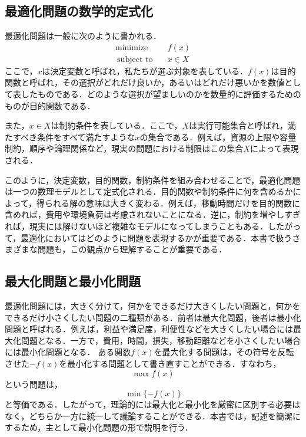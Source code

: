 \subsection{最適化問題の数学的定式化}
最適化問題は一般に次のように書かれる．
\begin{align}
\text{minimize}\quad&f(x)\\\
\text{subject to}\quad&x\in X
\end{align}
ここで，$x$は決定変数と呼ばれ，私たちが選ぶ対象を表している．$f(x)$は目的関数と呼ばれ，その選択がどれだけ良いか，あるいはどれだけ悪いかを数値として表したものである．どのような選択が望ましいのかを数量的に評価するためのものが目的関数である．

また，$x\in X$は制約条件を表している．ここで，$X$は実行可能集合と呼ばれ，満たすべき条件をすべて満たすような$x$の集合である．例えば，資源の上限や容量制約，順序や論理関係など，現実の問題における制限はこの集合$X$によって表現される．

このように，決定変数，目的関数，制約条件を組み合わせることで，最適化問題は一つの数理モデルとして定式化される．目的関数や制約条件に何を含めるかによって，得られる解の意味は大きく変わる．例えば，移動時間だけを目的関数に含めれば，費用や環境負荷は考慮されないことになる．逆に，制約を増やしすぎれば，現実には解けないほど複雑なモデルになってしまうこともある．したがって，最適化においてはどのように問題を表現するかが重要である．本書で扱うさまざまな問題も，この観点から理解することが重要である．

\subsection{最大化問題と最小化問題}

最適化問題には，大きく分けて，何かをできるだけ大きくしたい問題と，何かをできるだけ小さくしたい問題の二種類がある．前者は最大化問題，後者は最小化問題と呼ばれる．例えば，利益や満足度，利便性などを大きくしたい場合には最大化問題となる．一方で，費用，時間，損失，移動距離などを小さくしたい場合には最小化問題となる．
ある関数$f(x)$を最大化する問題は，その符号を反転させた$-f(x)$を最小化する問題として書き直すことができる．すなわち，
\begin{equation}
\max f(x)
\end{equation}
という問題は，
\begin{equation}
\min \{-f(x)\}
\end{equation}
と等価である．したがって，理論的には最大化と最小化を厳密に区別する必要はなく，どちらか一方に統一して議論することができる．本書では，記述を簡潔にするため，主として最小化問題の形で説明を行う．

